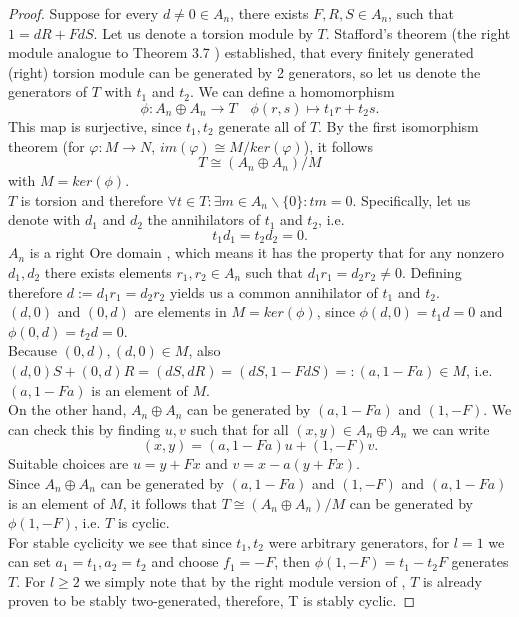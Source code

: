 \documentclass[pdflatex,sn-mathphys-num]{sn-jnl}
\numberwithin{equation}{section}
\theoremstyle{thmstyleone}
\theoremstyle{thmstyletwo}
\begin{document}
\begin{proof}
    Suppose for every $d\neq 0 \in A_n$, there exists $F, R, S \in A_n$, such that $1 = dR + FdS$. Let us denote a torsion module by $T$. Stafford's theorem (the right module analogue to Theorem 3.7 \mbox{\cite[p.~438]{Stafford1978}}) established, that every finitely generated (right) torsion module can be generated by 2 generators, so let us denote the generators of $T$ with $t_1$ and $t_2$. We can define a homomorphism
    \[\phi:A_n \oplus A_n\rightarrow T \quad \phi(r,s)\mapsto t_1r+t_2s.\]
    This map is surjective, since $t_1, t_2$ generate all of $T$. By the first isomorphism theorem (for $\varphi:M\rightarrow N$, $im(\varphi) \cong M/ker(\varphi)$), it follows
    \[T \cong (A_n\oplus A_n)/M\]
    with $M = ker(\phi)$. \\
    $T$ is torsion and therefore $\forall t\in T: \exists m \in A_n\backslash\{0\}: tm = 0.$ Specifically, let us denote with $d_1$ and $d_2$ the annihilators of $t_1$ and $t_2$, i.e.
    \[t_1d_1 = t_2d_2 = 0.\]
    $A_n$ is a right Ore domain \cite[Prop. 1.8.4]{Bjork}, which means it has the property that for any nonzero $d_1, d_2$ there exists elements $r_1, r_2 \in A_n$ such that $d_1r_1 = d_2r_2 \neq 0.$
    Defining therefore $d := d_1r_1 = d_2r_2$ yields us a common annihilator of $t_1$ and $t_2$.\\
    $(d, 0)$ and $(0,d)$ are elements in $M = ker(\phi)$, since $\phi(d, 0) = t_1d = 0$ and $\phi(0, d) = t_2d = 0.$\\
    Because $(0,d), (d, 0) \in M$, also
    $(d, 0)S + (0, d)R = (dS, dR) = (dS, 1-FdS) =: (a, 1-Fa) \in M$, i.e. $(a, 1-Fa)$ is an element of $M$. \\
    On the other hand, $A_n\oplus A_n$ can be generated by $(a, 1-Fa)$ and $(1, -F)$. We can check this by finding $u,v$ such that for all $(x,y)\in A_n\oplus A_n$ we can write
    \[(x,y) = (a, 1-Fa)u + (1, -F)v.\]
    Suitable choices are $u = y+Fx$ and $v = x-a(y+Fx)$.\\
    Since  $A_n\oplus A_n$ can be generated by $(a, 1-Fa)$ and $(1, -F)$ and $(a, 1-Fa)$ is an element of $M$, it follows that $T \cong (A_n\oplus A_n)/M$ can be generated by $\phi(1, -F)$, i.e. $T$ is cyclic. \\
    For stable cyclicity we see that since $t_1, t_2$ were arbitrary generators, for $l = 1$ we can set $a_1 = t_1, a_2 = t_2$ and choose $f_1 = -F$, then $\phi(1, -F) = t_1 - t_2F$ generates $T$. For $l\geq 2$ we simply note that by the right module version of \cite[Theorem~3.7]{Stafford1978}, $T$ is already proven to be stably two-generated, therefore, T is stably cyclic.
    
\end{proof}
\end{document}
